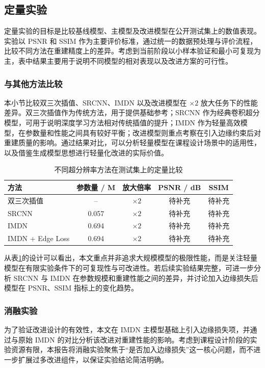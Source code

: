 \documentclass[bwprint]{report}
\begin{document}
\subsection{定量实验}
定量实验的目标是比较基线模型、主模型及改进模型在公开测试集上的数值表现。实验以 PSNR 和 SSIM 作为主要评价标准，通过统一的数据预处理与评价流程，比较不同方法在重建精度上的差异。考虑到当前阶段以小样本验证和最小可复现为主，表中结果主要用于说明不同模型的相对表现以及改进方案的可行性。

\subsubsection{与其他方法比较}
本小节比较双三次插值、SRCNN、IMDN 以及改进模型在 $\times 2$ 放大任务下的性能差异。双三次插值作为传统方法，用于提供基础参考；SRCNN 作为经典卷积超分模型，可用于说明深度学习方法相对传统插值的提升；IMDN 作为轻量高效模型，在参数量和性能之间具有较好平衡；改进模型则重点考察在引入边缘约束后对重建质量的影响。通过结果对比，可以分析轻量模型在课程设计场景中的适用性，以及借鉴生成模型思想进行轻量化改进的实际价值。

\begin{table}[!htbp]
    \caption{不同超分辨率方法在测试集上的定量比较}
    \label{tab:quantitative-comparison}
    \centering
    \begin{tabular}{lcccc}
        \toprule[1.5pt]
        方法 & 参数量 / M & 放大倍率 & PSNR / dB & SSIM \\
        \midrule[1pt]
        双三次插值 & -- & $\times 2$ & 待补充 & 待补充 \\
        SRCNN & 0.057 & $\times 2$ & 待补充 & 待补充 \\
        IMDN & 0.694 & $\times 2$ & 待补充 & 待补充 \\
        IMDN + Edge Loss & 0.694 & $\times 2$ & 待补充 & 待补充 \\
        \bottomrule[1.5pt]
    \end{tabular}
\end{table}

从表\ref{tab:quantitative-comparison}的设计可以看出，本文重点并非追求大规模模型的极限性能，而是关注轻量模型在有限实验条件下的可复现性与可改进性。若后续实验结果完整，可进一步分析 SRCNN 与 IMDN 在参数规模和重建性能之间的差异，并讨论加入边缘损失后模型在 PSNR、SSIM 指标上的变化趋势。

\subsubsection{消融实验}
为了验证改进设计的有效性，本文在 IMDN 主模型基础上引入边缘损失项，并通过与原始 IMDN 的对比分析该改进对重建性能的影响。考虑到课程设计阶段的实验资源有限，本报告将消融实验聚焦于“是否加入边缘损失”这一核心问题，而不进一步扩展过多改进组件，以保证实验结论简洁明确。
\end{document}
